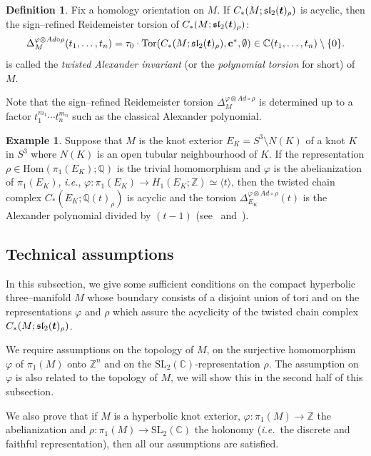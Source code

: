 \documentclass[a4paper]{amsart}
\theoremstyle{plain}
\theoremstyle{definition}
\newtheorem{definition}{Definition}
\newtheorem{example}{Example}%
\theoremstyle{remark}
\newcommand{\ie}{\emph{i.e.}}
\newcommand{\ZZ}{{\mathbb Z}}
\newcommand{\CC}{{\mathbb C}}
\newcommand{\Q}{{\mathbb Q}}
\newcommand{\SL}{{\mathrm{SL}_2(\CC)}}
\newcommand{\bm}[1]{\mbox{\boldmath $#1$}}
\newcommand{\sllmt}{\mathfrak{sl}_2(\bm{t})}
\newcommand{\PolyTors}[2]{\Delta_{#1}^{#2}}
\newcommand{\Tor}[3]{\mathrm{Tor} ({#1}, {#2}, {#3})}
\newcommand{\otAd}[2]{#1 \otimes Ad \circ #2}
\newcommand{\cbasis}[2][c]{\mathbf{#1}^{#2}}
\begin{document}
\begin{definition}\label{def:AlexTorsion}
Fix a homology orientation on $M$. 
  If $C_*(M;\sllmt_\rho)$ is acyclic, then the sign--refined Reidemeister torsion
  of $C_*(M;\sllmt_\rho)$:
  $$
  \PolyTors{M}{\otAd{\varphi}{\rho}}(t_1, \ldots, t_n) = 
    \tau_0 \cdot
    \Tor{C_*(M;\sllmt_\rho)}{\cbasis{*}}{\emptyset} 
    \in \CC(t_1, \ldots, t_n) \setminus \{0\}.
  $$
  is called the \emph{twisted Alexander invariant} (or the \emph{polynomial torsion} for short) of $M$.
\end{definition}

Note that the sign--refined Reidemeister torsion
$\PolyTors{M}{\otAd{\varphi}{\rho}}$ is determined up to a factor
$t_1^{m_1} \cdots t_n^{m_n}$ such as the classical Alexander polynomial.

\begin{example}
  Suppose that $M$ is the knot exterior $E_K = S^3 \setminus N(K)$ of
  a knot $K$ in $S^3$ where $N(K)$ is an open tubular neighbourhood of
  $K$. If the representation $\rho \in \mathrm{Hom}(\pi_1(E_K); \Q)$
  is the trivial homomorphism and $\varphi$ is the abelianization of
  $\pi_1(E_K)$, \ie, $\varphi:\pi_1(E_K) \to H_1(E_K;\ZZ) \simeq
  \langle t\rangle$, then the twisted chain complex $C_*(E_K;
  \Q(t)_\rho)$ is acyclic and the torsion $\Delta_{E_K}^{\varphi
    \otimes Ad \circ \rho}(t)$ is the Alexander polynomial divided by
  $(t-1)$ (see~\cite{Milnor:1962} and~\cite{Turaev:2002}).
\end{example}


\subsection{Technical assumptions}
\label{section:hyp}

In this subsection, we give some sufficient conditions on the compact
hyperbolic three--manifold $M$ whose boundary consists of
a disjoint union of tori and on the representations $\varphi$ and
$\rho$ which assure the acyclicity of the twisted chain complex
$C_*(M;\sllmt_\rho)$. 

We require assumptions on the topology of $M$,
on the surjective homomorphism $\varphi$ of $\pi_1(M)$ onto $\ZZ^n$ and
on the $\SL$-representation $\rho$. The assumption on $\varphi$ is also
related to the topology of $M$, we will show this in the second half
of this subsection.

We also prove that if $M$ is a hyperbolic knot exterior,
$\varphi\colon \pi_1(M) \to \ZZ$ the abelianization and $\rho\colon
\pi_1(M) \to \SL$ the holonomy (\ie~the discrete and faithful
representation), then all our assumptions are satisfied.
\end{document}
